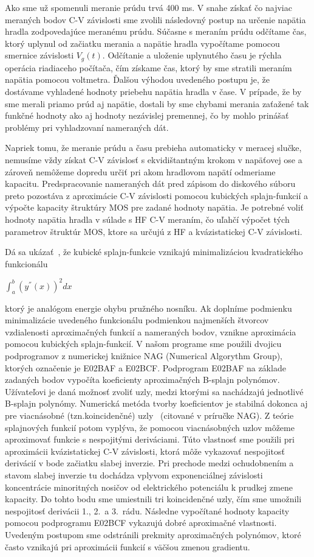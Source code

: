 Ako sme už spomenuli meranie prúdu trvá 400 ms.  V snahe získať čo
najviac meraných bodov C-V závislosti sme zvolili následovný postup na
určenie napätia hradla zodpovedajúce meranému prúdu. Súčasne s meraním
prúdu odčítame čas, ktorý uplynul od začiatku merania a napätie hradla
vypočítame pomocou smernice závislosti $V_{g}(t)$. Odčítanie a
uloženie uplynutého času je rýchla operácia riadiaceho počítača, čím
získame čas, ktorý by sme stratili meraním napätia pomocou
voltmetra. Ďalšou výhodou uvedeného postupu je, že dostávame vyhladené
hodnoty priebehu napätia hradla v čase. V prípade, že by sme merali
priamo prúd aj napätie, dostali by sme chybami merania zaťažené tak
funkčné hodnoty ako aj hodnoty nezávislej premennej, čo by mohlo
prinášať problémy pri vyhladzovaní nameraných dát.

Napriek tomu, že meranie prúdu a času prebieha automaticky v meracej
slučke, nemusíme vždy získat C-V závislosť s ekvidištantným krokom v
napäťovej ose a zároveň nemôžeme dopredu určiť pri akom hradlovom
napätí odmeriame kapacitu.  Predspracovanie nameraných dát pred
zápisom do diskového súboru preto pozostáva z aproximácie C-V
závislosti pomocou kubických splajn-funkcií a výpočte kapacity
štruktúry MOS pre zadané hodnoty napätia. Je potrebné voliť hodnoty
napätia hradla v súlade s HF C-V meraním, čo uľahčí výpočet tých
parametrov štruktúr MOS, ktore sa určujú z HF a kvázistatickej C-V
závislosti.

Dá sa ukázať~\cite{5.4}, že kubické splajn-funkcie vznikajú
minimalizáciou kvadratického funkcionálu

$\int_{a}^{b}{(y^{''}(x))}^{2}dx$

ktorý je analógom energie ohybu pružného nosníku. Ak doplníme
podmienku minimalizácie uvedeného funkcionálu podmienkou najmenších
štvorcov vzdialenosti aproximačných funkcií a nameraných bodov,
vznikne aproximácia pomocou kubických splajn-funkcií. V našom programe
sme použili dvojicu podprogramov z numerickej knižnice NAG (Numerical
Algorythm Group), ktorých označenie je E02BAF a E02BCF\@. Podprogram
E02BAF na základe zadaných bodov vypočíta koeficienty aproximačných
B-splajn polynómov.  Užívateľovi je daná možnosť zvoliť uzly, medzi
ktorými sa nachádzajú jednotlivé B-splajn polynómy. Numerická metóda
tvorby koeficientov je stabilná dokonca aj pre viacnásobné
(tzn.koincidenčné) uzly~\cite{5.5, 5.6} (citované v príručke NAG). Z
teórie splajnových funkcií potom vyplýva, že pomocou viacnásobných
uzlov môžeme aproximovať funkcie s nespojitými deriváciami. Túto
vlastnosť sme použili pri aproximácii kvázistatickej C-V závislosti,
ktorá môže vykazovať nespojitosť derivácií v bode začiatku slabej
inverzie. Pri prechode medzi ochudobnením a stavom slabej inverzie tu
dochádza vplyvom exponenciálnej závislosti koncentrácie minoritných
nosičov od elektrického potenciálu k prudkej zmene kapacity. Do tohto
bodu sme umiestnili tri koincidenčné uzly, čím sme umožnili
nespojitosť derivácii 1., 2.\ a 3.\ rádu. Následne vypočítané hodnoty
kapacity pomocou podprogramu E02BCF vykazujú dobré aproximačné
vlastnosti. Uvedeným postupom sme odstránili prekmity aproximačných
polynómov, ktoré často vznikajú pri aproximácii funkcií s väčšou
zmenou gradientu.

